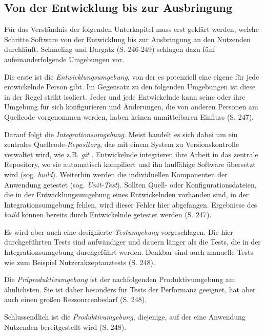 \documentclass[11pt,a4paper]{article}
\begin{document}
\subsection{Von der Entwicklung bis zur Ausbringung}
Für das Verständnis der folgenden Unterkapitel muss erst geklärt werden,
welche Schritte Software von der Entwicklung bis zur Ausbringung an den
Nutzenden durchläuft.
Schmeling und Dargatz \cite{Schmeling_Dargatz_2022} (S. 246-249) schlagen dazu
fünf aufeinanderfolgende Umgebungen vor.

Die erste ist die \emph{Entwicklungsumgebung}, von der es potenziell
eine eigene für jede entwickelnde Person gibt. Im Gegensatz zu den folgenden
Umgebungen ist diese in der Regel strikt isoliert. Jeder und jede Entwickelnde
kann seine oder ihre Umgebung für sich konfigurieren und Änderungen, die von anderen
Personen am Quellcode vorgenommen werden, haben keinen unmittelbaren Einfluss \cite{Schmeling_Dargatz_2022} (S. 247).

Darauf folgt die \emph{Integrationsumgebung}. Meist handelt es sich dabei
um ein zentrales Quellcode-\emph{Repository}, das mit einem System zu Versionskontrolle
verwaltet wird, wie z.B. \emph{git} \cite{chacon2014pro}.
Entwickelnde integrieren ihre Arbeit in das zentrale Repository, wo sie
automatisch kompiliert und ihn lauffähige Software übersetzt wird (sog. \emph{build}).
Weiterhin werden die individuellen Komponenten der Anwendung getestet (sog. \emph{Unit-Test}).
Sollten Quell- oder Konfigurationsdateien, die in der Entwicklungsumgebung
eines Entwickelnden vorhanden sind, in der Integrationsumgebung fehlen,
wird dieser Fehler hier abgefangen.
Ergebnisse des \emph{build} können bereits durch Entwickelnde getestet werden \cite{Schmeling_Dargatz_2022} (S. 247).

Es wird aber auch eine designierte \emph{Testumgebung} vorgeschlagen.
Die hier durchgeführten Tests sind aufwändiger und dauern länger als
die Tests, die in der Integrationsumgebung durchgeführt werden.
Denkbar sind auch manuelle Tests wie zum Beispiel Nutzerakzeptanztests \cite{Schmeling_Dargatz_2022} (S. 248).

Die \emph{Präproduktivumgebung} ist der nachfolgenden Produktivumgebung am ähnlichsten.
Sie ist daher besonders für Tests der Performanz geeignet, hat
aber auch einen großen Ressourcenbedarf \cite{Schmeling_Dargatz_2022} (S. 248).

Schlussendlich ist die \emph{Produktivumgebung}, diejenige, auf der eine Anwendung
Nutzenden bereitgestellt wird \cite{Schmeling_Dargatz_2022} (S. 248).
\end{document}
